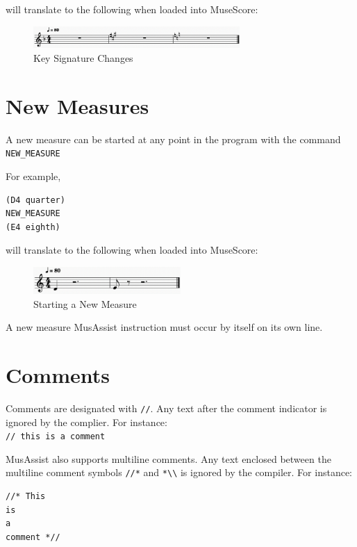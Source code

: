 \documentclass{report}
\begin{document}
will translate to the following when loaded into MuseScore:

\begin{figure}[h!]
\centering
\includegraphics[width=0.7\textwidth]{images/keys}
  \caption{Key Signature Changes}
\end{figure}
\newpage

\section{New Measures}
A new measure can be started at any point in the program with the command \verb.NEW_MEASURE.

For example,
\begin{verbatim}
(D4 quarter)
NEW_MEASURE
(E4 eighth)
\end{verbatim}

will translate to the following when loaded into MuseScore:

\begin{figure}[h!]
\centering
\includegraphics[width=0.5\textwidth]{images/newmeasure}
  \caption{Starting a New Measure}
\end{figure}

A new measure MusAssist instruction must occur by itself on its own line.

\section{Comments}
Comments are designated with \verb.//.. Any text after the comment indicator is ignored by the complier. For instance:\\ \verb.// this is a comment.

MusAssist also supports multiline comments. Any text enclosed between the multiline comment symbols \verb.//*. and \verb.*\\. is ignored by the compiler. For instance:
\begin{verbatim}
//* This 
is 
a 
comment *//
\end{verbatim}
\end{document}
